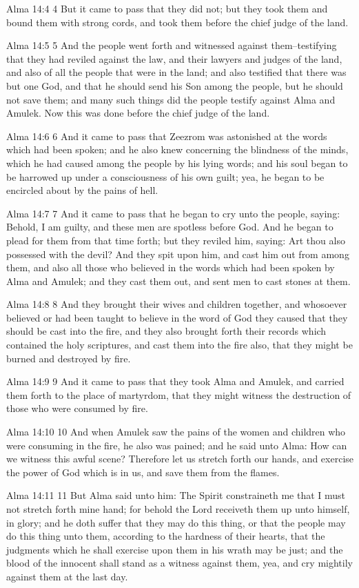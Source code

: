 Alma 14:4
 4 But it came to pass that they did not; but they took them and
bound them with strong cords, and took them before the chief
judge of the land.

Alma 14:5
 5 And the people went forth and witnessed against
them--testifying that they had reviled against the law, and their
lawyers and judges of the land, and also of all the people that
were in the land; and also testified that there was but one God,
and that he should send his Son among the people, but he should
not save them; and many such things did the people testify
against Alma and Amulek. Now this was done before the chief
judge of the land.

Alma 14:6
 6 And it came to pass that Zeezrom was astonished at the words
which had been spoken; and he also knew concerning the blindness
of the minds, which he had caused among the people by his lying
words; and his soul began to be harrowed up under a consciousness
of his own guilt; yea, he began to be encircled about by the
pains of hell.

Alma 14:7
 7 And it came to pass that he began to cry unto the people,
saying: Behold, I am guilty, and these men are spotless before
God. And he began to plead for them from that time forth; but
they reviled him, saying: Art thou also possessed with the devil?
And they spit upon him, and cast him out from among them, and
also all those who believed in the words which had been spoken by
Alma and Amulek; and they cast them out, and sent men to cast
stones at them.

Alma 14:8
 8 And they brought their wives and children together, and
whosoever believed or had been taught to believe in the word of
God they caused that they should be cast into the fire, and they
also brought forth their records which contained the holy
scriptures, and cast them into the fire also, that they might be
burned and destroyed by fire.

Alma 14:9
 9 And it came to pass that they took Alma and Amulek, and
carried them forth to the place of martyrdom, that they might
witness the destruction of those who were consumed by fire.

Alma 14:10
 10 And when Amulek saw the pains of the women and children who
were consuming in the fire, he also was pained; and he said unto
Alma: How can we witness this awful scene? Therefore let us
stretch forth our hands, and exercise the power of God which is
in us, and save them from the flames.

Alma 14:11
 11 But Alma said unto him: The Spirit constraineth me that I
must not stretch forth mine hand; for behold the Lord receiveth
them up unto himself, in glory; and he doth suffer that they may
do this thing, or that the people may do this thing unto them,
according to the hardness of their hearts, that the judgments
which he shall exercise upon them in his wrath may be just; and
the blood of the innocent shall stand as a witness against them,
yea, and cry mightily against them at the last day.

